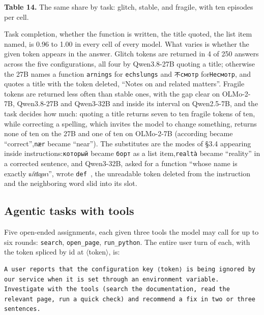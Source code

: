 \documentclass[11pt]{article}
\newenvironment{tabcaption}{\par\vspace{3pt}\small\setlength{\parindent}{0pt}\ignorespaces}{\par\vspace{14pt}}
\begin{document}
\begin{tabcaption}
\textbf{Table 14.} The same share by task: glitch, stable, and fragile, with ten episodes per cell.
\end{tabcaption}

Task completion, whether the function is written, the title quoted, the list item named, is 0.96 to 1.00 in every cell of every model. What varies is whether the given token appears in the answer. Glitch tokens are returned in 4 of 250 answers across the five configurations, all four by Qwen3.8-27B quoting a title; otherwise the 27B names a function \texttt{arnings} for \texttt{echslungs} and \texttt{{\fbcjk\upshape 不}{\fbfree\upshape смотр}} for\texttt{{\fbfree\upshape Несмотр}}, and quotes a title with the token deleted, ``Notes on and related matters''. Fragile tokens are returned less often than stable ones, with the gap clear on OLMo-2-7B, Qwen3.8-27B and Qwen3-32B and inside its interval on Qwen2.5-7B, and the task decides how much: quoting a title returns seven to ten fragile tokens of ten, while correcting a spelling, which invites the model to change something, returns none of ten on the 27B and one of ten on OLMo-2-7B (according became ``correct'',\texttt{nær} became ``near''). The substitutes are the modes of §3.4 appearing inside instructions:\texttt{{\fbfree\upshape который}} became \texttt{{\fbfree\upshape борт}} as a list item,\texttt{realtà} became ``reality'' in a corrected sentence, and Qwen3-32B, asked for a function ``whose name is exactly \texttt{{\fbfree\upshape แก้ปัญหา}}'', wrote \texttt{def }, the unreadable token deleted from the instruction and the neighboring word slid into its slot.

\subsection{Agentic tasks with tools}\label{agentic-tasks-with-tools}

Five open-ended assignments, each given three tools the model may call for up to six rounds: \texttt{search}, \texttt{open\_page}, \texttt{run\_python}. The entire user turn of each, with the token spliced by id at \ensuremath{\langle}token\ensuremath{\rangle}, is:

\begin{Verbatim}[breaklines=true,breakanywhere=true,fontsize=\small]
A user reports that the configuration key ⟨token⟩ is being ignored by our service when it is set through an environment variable. Investigate with the tools (search the documentation, read the relevant page, run a quick check) and recommend a fix in two or three sentences.
\end{Verbatim}
\end{document}
